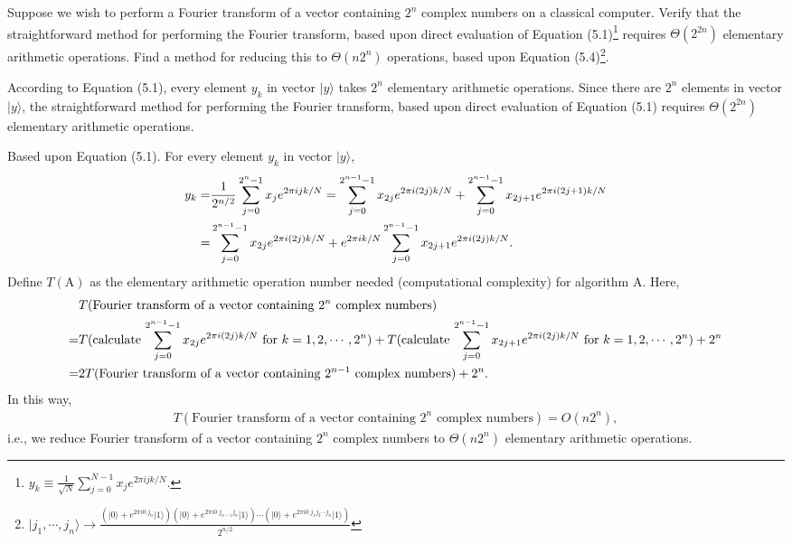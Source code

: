\documentclass[en]{sol-man}
\begin{document}
\begin{exe}
    Suppose we wish to perform a Fourier transform of a vector containing $2^n$ complex numbers on a classical computer. Verify that the straightforward method for performing the Fourier transform, based upon direct evaluation of Equation (5.1)\footnote{\label{Equ-5.1}$y_k\equiv\frac{1}{\sqrt{N}}\sum_{j=0}^{N-1}x_je^{2\pi ijk/N}$.} requires $\Theta(2^{2n})$ elementary arithmetic operations. Find a method for reducing this to $\Theta(n2^n)$ operations, based upon Equation (5.4)\footnote{\label{Equ-5.4}$\lvert j_1,\cdots,j_n\rangle\rightarrow\frac{\left(\lvert 0\rangle+e^{2\pi i0.j_n}\lvert 1\rangle\right)\left(\lvert 0\rangle+e^{2\pi i0.j_{n-1}j_n}\lvert 1\rangle\right)\cdots\left(\lvert 0\rangle+e^{2\pi i0.j_1j_2\cdots j_n}\lvert 1\rangle\right)}{2^{n/2}}$}.
\end{exe}
\begin{sol}
    According to Equation (5.1), every element $y_k$ in vector $\lvert y\rangle$ takes $2^n$ elementary arithmetic operations. Since there are $2^n$ elements in vector $\lvert y\rangle$, the straightforward method for performing the Fourier transform, based upon direct evaluation of Equation (5.1) requires $\Theta(2^{2n})$ elementary arithmetic operations.

    Based upon Equation (5.1). For every element $y_k$ in vector $\lvert y\rangle$,
    \begin{align}
        \notag y_k=&\frac{1}{2^{n/2}}\sum_{j=0}^{2^n-1}x_je^{2\pi ijk/N}=\sum_{j=0}^{2^{n-1}-1}x_{2j}e^{2\pi i(2j)k/N}+\sum_{j=0}^{2^{n-1}-1}x_{2j+1}e^{2\pi i(2j+1)k/N}\\
        =&\sum_{j=0}^{2^{n-1}-1}x_{2j}e^{2\pi i(2j)k/N}+e^{2\pi ik/N}\sum_{j=0}^{2^{n-1}-1}x_{2j+1}e^{2\pi i(2j)k/N}.
    \end{align}
    Define $T(\text{A})$ as the elementary arithmetic operation number needed (computational complexity) for algorithm A. Here,
    \begin{align}
        \notag&T(\text{Fourier transform of a vector containing $2^n$ complex numbers})\\
        \notag=&T(\text{calculate $\sum_{j=0}^{2^{n-1}-1}x_{2j}e^{2\pi i(2j)k/N}$ for }k=1,2,\cdots,2^n)+T(\text{calculate $\sum_{j=0}^{2^{n-1}-1}x_{2j+1}e^{2\pi i(2j)k/N}$ for }k=1,2,\cdots,2^n)+2^n\\
        \notag=&2T(\text{Fourier transform of a vector containing $2^{n-1}$ complex numbers})+2^n.
    \end{align}
    In this way,
    \begin{align}
        T(\text{Fourier transform of a vector containing $2^n$ complex numbers})=O(n2^n),
    \end{align}
    i.e., we reduce Fourier transform of a vector containing $2^n$ complex numbers to $\Theta(n2^n)$ elementary arithmetic operations.
\end{sol}
\end{document}
